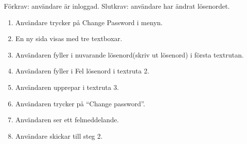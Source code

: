 \documentclass[paper=a4, fontsize=11pt,twoside]{article}
\begin{document}
		
		Förkrav: användare är inloggad. 
		\newline 
		Slutkrav: användare har ändrat lösenordet.
		
		\begin{enumerate}
		\item Användare trycker på Change Password i menyn.
		\item	En ny sida visas med tre textboxar.
		\item	Användaren fyller i nuvarande lösenord(skriv ut lösenord) i första
		textrutan.
		\item Användaren fyller i Fel lösenord i textruta 2.
		\item	Användaren upprepar i textruta 3.
		\item	Användaren trycker på “Change password”.
		\item	Användaren ser ett felmeddelande.
		\item	Användare skickar till steg 2.
		  
		\end{enumerate}
		
		
		
		
\end{document}
